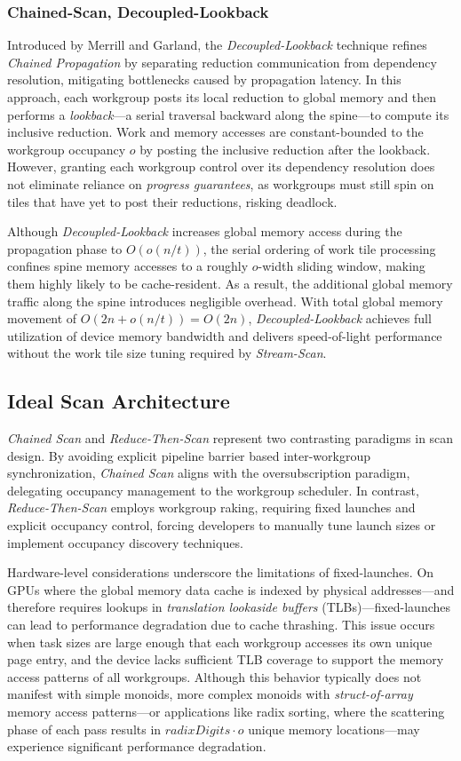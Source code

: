 \documentclass[sigconf]{acmart}
\begin{document}
\subsubsection{Chained-Scan, Decoupled-Lookback}
Introduced by Merrill and Garland, the \emph{Decoupled-Lookback} technique refines \emph{Chained Propagation} by separating reduction communication from dependency resolution, mitigating bottlenecks caused by propagation latency. In this approach, each workgroup posts its local reduction to global memory and then performs a \emph{lookback}---a serial traversal backward along the spine---to compute its inclusive reduction. Work and memory accesses are constant-bounded to the workgroup occupancy $o$ by posting the inclusive reduction after the lookback. However, granting each workgroup control over its dependency resolution does not eliminate reliance on \emph{progress guarantees}, as workgroups must still spin on tiles that have yet to post their reductions, risking deadlock.

Although \emph{Decoupled-Lookback} increases global memory access during the propagation phase to $O(o(n/t))$, the serial ordering of work tile processing confines spine memory accesses to a roughly $o$-width sliding window, making them highly likely to be cache-resident. As a result, the additional global memory traffic along the spine introduces negligible overhead. With total global memory movement of $O(2n+o(n/t))= O(2n)$, \emph{Decoupled-Lookback} achieves full utilization of device memory bandwidth and delivers speed-of-light performance without the work tile size tuning required by \emph{Stream-Scan}.

\subsection{Ideal Scan Architecture}
\emph{Chained Scan} and \emph{Reduce-Then-Scan} represent two contrasting paradigms in scan design. By avoiding explicit pipeline barrier based inter-workgroup synchronization, \emph{Chained Scan} aligns with the oversubscription paradigm, delegating occupancy management to the workgroup scheduler. In contrast, \emph{Reduce-Then-Scan} employs workgroup raking, requiring fixed launches and explicit occupancy control, forcing developers to manually tune launch sizes or implement occupancy discovery techniques.

Hardware-level considerations underscore the limitations of fixed-launches. On GPUs where the global memory data cache is indexed by physical addresses---and therefore requires lookups in \emph{translation lookaside buffers} (TLBs)---fixed-launches can lead to performance degradation due to cache thrashing. This issue occurs when task sizes are large enough that each workgroup accesses its own unique page entry, and the device lacks sufficient TLB coverage to support the memory access patterns of all workgroups. Although this behavior typically does not manifest with simple monoids, more complex monoids with \emph{struct-of-array} memory access patterns---or applications like radix sorting, where the scattering phase of each pass results in $radixDigits \cdot o$ unique memory locations---may experience significant performance degradation.
\end{document}
